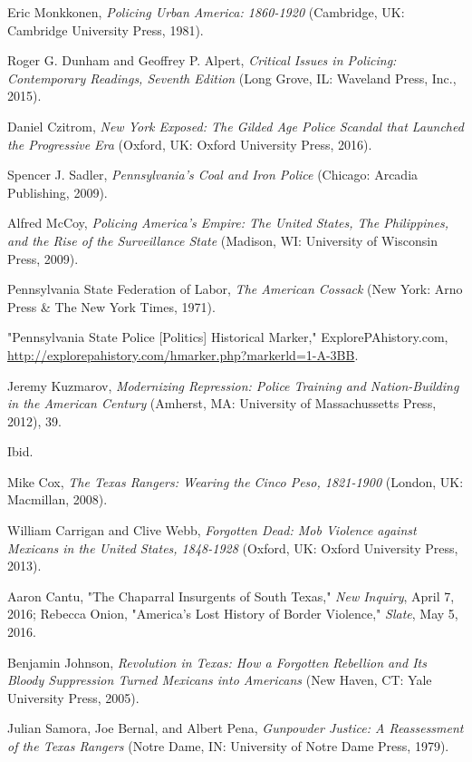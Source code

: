 \documentclass[fontset=fandol, a4paper, 12pt, openright]{ctexbook}
\begin{document}
\begin{enumerate}[label={[\arabic*]}]
    \item Eric Monkkonen, \textit{Policing Urban America: 1860-1920} (Cambridge, UK: Cambridge University Press, 1981).
    \item Roger G. Dunham and Geoffrey P. Alpert, \textit{Critical Issues in Policing: Contemporary Readings, Seventh Edition} (Long Grove, IL: Waveland Press, Inc., 2015).
    \item Daniel Czitrom, \textit{New York Exposed: The Gilded Age Police Scandal that Launched the Progressive Era} (Oxford, UK: Oxford University Press, 2016).
    \item Spencer J. Sadler, \textit{Pennsylvania's Coal and Iron Police} (Chicago: Arcadia Publishing, 2009).
    \item Alfred McCoy, \textit{Policing America's Empire: The United States, The Philippines, and the Rise of the Surveillance State} (Madison, WI: University of Wisconsin Press, 2009).
    \item Pennsylvania State Federation of Labor, \textit{The American Cossack} (New York: Arno Press \& The New York Times, 1971).
    \item "Pennsylvania State Police [Politics] Historical Marker," ExplorePAhistory.com, \url{http://explorepahistory.com/hmarker.php?markerld=1-A-3BB}.
    \item Jeremy Kuzmarov, \textit{Modernizing Repression: Police Training and Nation-Building in the American Century} (Amherst, MA: University of Massachussetts Press, 2012), 39.
    \item Ibid.
    \item Mike Cox, \textit{The Texas Rangers: Wearing the Cinco Peso, 1821-1900} (London, UK: Macmillan, 2008).
    \item William Carrigan and Clive Webb, \textit{Forgotten Dead: Mob Violence against Mexicans in the United States, 1848-1928} (Oxford, UK: Oxford University Press, 2013).
    \item Aaron Cantu, "The Chaparral Insurgents of South Texas," \textit{New Inquiry}, April 7, 2016; Rebecca Onion, "America's Lost History of Border Violence," \textit{Slate}, May 5, 2016.
    \item Benjamin Johnson, \textit{Revolution in Texas: How a Forgotten Rebellion and Its Bloody Suppression Turned Mexicans into Americans} (New Haven, CT: Yale University Press, 2005).
    \item Julian Samora, Joe Bernal, and Albert Pena, \textit{Gunpowder Justice: A Reassessment of the Texas Rangers} (Notre Dame, IN: University of Notre Dame Press, 1979).

\end{enumerate}
\end{document}
